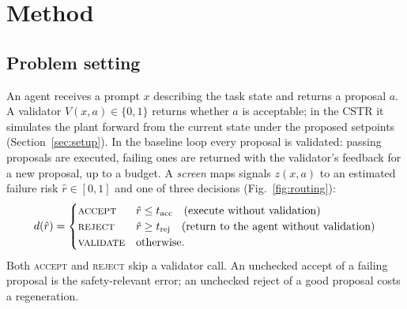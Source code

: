 \section{Method}\label{sec:method}

\subsection{Problem setting}
An agent receives a prompt $x$ describing the task state and returns a proposal $a$. A validator $V(x,a)\in\{0,1\}$
returns whether $a$ is acceptable; in the CSTR it simulates the plant forward from the current state under the
proposed setpoints (Section~\ref{sec:setup}). In the baseline loop every proposal is validated: passing proposals are
executed, failing ones are returned with the validator's feedback for a new proposal, up to a budget. A
\emph{screen} maps signals $z(x,a)$ to an estimated failure risk $\hat r\in[0,1]$ and one of three decisions
(Fig.~\ref{fig:routing}):
\begin{equation}
d(\hat r)=\begin{cases}
\textsc{accept} & \hat r\le t_{\mathrm{acc}} \quad\text{(execute without validation)}\\
\textsc{reject} & \hat r\ge t_{\mathrm{rej}} \quad\text{(return to the agent without validation)}\\
\textsc{validate} & \text{otherwise.}
\end{cases}
\end{equation}
Both \textsc{accept} and \textsc{reject} skip a validator call. An unchecked accept of a failing proposal is the
safety-relevant error; an unchecked reject of a good proposal costs a regeneration.

